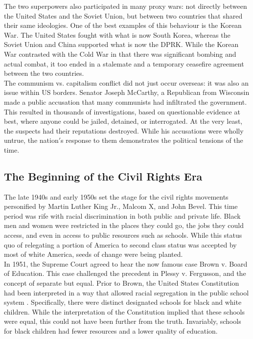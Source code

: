 \documentclass[12pt]{article}
\begin{document}
The two superpowers also participated in many proxy wars: not directly between the United States and the Soviet Union, but between two countries that shared their same ideologies\cite{18}. One of the best examples of this behaviour is the Korean War. The United States fought with what is now South Korea, whereas the Soviet Union and China supported what is now the DPRK\cite{19}. While the Korean War contrasted with the Cold War in that there was significant bombing and actual combat, it too ended in a stalemate and a temporary ceasefire agreement between the two countries\cite{19}.\\

The communism vs. capitalism conflict did not just occur overseas: it was also an issue within US borders. Senator Joseph McCarthy, a Republican from Wisconsin made a public accusation that many communists had infiltrated the government\cite{20}. This resulted in thousands of investigations, based on questionable evidence at best, where anyone could be jailed, detained, or interrogated. At the very least, the suspects had their reputations destroyed\cite{20}. While his accusations were wholly untrue, the nation$'$s response to them demonstrates the political tensions of the time.

\subsection{The Beginning of the Civil Rights Era}

The late 1940s and early 1950s set the stage for the civil rights movements personified by Martin Luther King Jr., Malcom X, and John Bevel. This time period was rife with racial discrimination in both public and private life. Black men and women were restricted in the places they could go, the jobs they could access, and even in access to public resources such as schools. While this status quo of relegating a portion of America to second class status was accepted by most of white America, seeds of change were being planted.\\

In 1951, the Supreme Court agreed to hear the now famous case Brown v. Board of Education. This case challenged the precedent in Plessy v. Fergusson, and the concept of separate but equal. Prior to Brown, the United States Constitution had been interpreted in a way that allowed racial segregation in the public school system \cite{21}. Specifically, there were distinct designated schools for black and white children. While the interpretation of the Constitution implied that these schools were equal, this could not have been further from the truth. Invariably, schools for black children had fewer resources and a lower quality of education.\\
\end{document}
